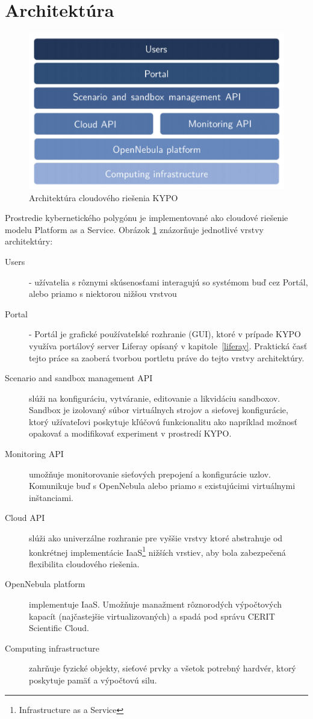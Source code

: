 \documentclass[
  digital, %
  twoside, %
  notable,   %
  nolof,   %
  nolot,   %
]{fithesis3}
\begin{document}
\section{Architektúra}
\begin{figure}
	\center
	\includegraphics[width=1.0\linewidth]{kypo_structure}
	\caption{Architektúra cloudového riešenia KYPO\cite{vceleda2015kypo}}
	\label{kypo_structure}
\end{figure}

Prostredie kybernetického polygónu je implementované ako cloudové riešenie modelu Platform as a Service. Obrázok \ref{kypo_structure} znázorňuje jednotlivé vrstvy architektúry:

\begin{description}
\item[Users] - užívatelia s rôznymi skúsenosťami interagujú so systémom buď cez Portál, alebo priamo s niektorou nižšou vrstvou
\item[Portal] - Portál je grafické používateľské rozhranie (GUI), ktoré v prípade KYPO využíva portálový server Liferay opísaný v kapitole~\ref{liferay}. Praktická časť tejto práce sa zaoberá tvorbou portletu práve do tejto vrstvy architektúry.
\item[Scenario and sandbox management API] slúži na konfiguráciu, vytváranie, editovanie a likvidáciu sandboxov. Sandbox je izolovaný súbor virtuálnych strojov a sieťovej konfigurácie, ktorý užívateľovi poskytuje kľúčovú funkcionalitu ako napríklad možnosť opakovať a modifikovať experiment v prostredí KYPO.
\item[Monitoring API] umožňuje monitorovanie sieťových prepojení a konfigurácie uzlov. Komunikuje buď s OpenNebula alebo priamo s existujúcimi virtuálnymi inštanciami.
\item[Cloud API] slúži ako univerzálne rozhranie pre vyššie vrstvy ktoré abstrahuje od konkrétnej implementácie IaaS\footnote{Infrastructure as a Service} nižších vrstiev, aby bola zabezpečená flexibilita cloudového riešenia.
\item[OpenNebula platform] implementuje IaaS\cite{sempolinski2010comparison}. Umožňuje manažment rôznorodých výpočtových kapacít (najčastejšie virtualizovaných) a spadá pod správu CERIT Scientific Cloud.
\item[Computing infrastructure] zahrňuje fyzické objekty, sieťové prvky a všetok potrebný hardvér, ktorý poskytuje pamäť a výpočtovú silu.
\end{description}
\end{document}
